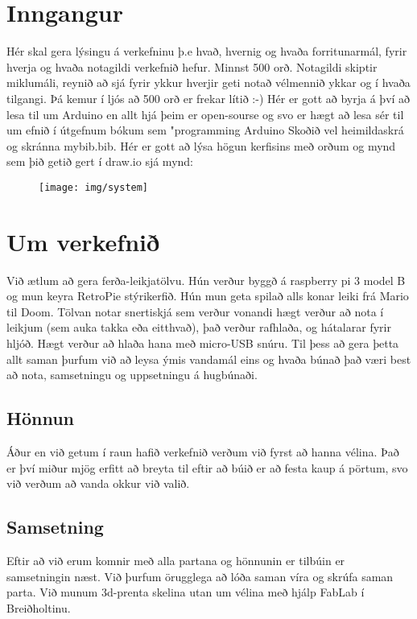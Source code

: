 \section{Inngangur}
Hér skal gera lýsingu á verkefninu þ.e hvað,  hvernig og  hvaða forritunarmál, fyrir hverja og hvaða notagildi verkefnið hefur. Minnst 500 orð. Notagildi skiptir miklumáli, reynið að sjá fyrir ykkur hverjir geti notað vélmennið ykkar og í hvaða tilgangi.  Þá kemur í ljós að 500 orð er frekar lítið :-) Hér er gott að byrja á því að lesa til um Arduino en allt hjá þeim er open-sourse og svo er hægt að lesa sér til um efnið í útgefnum bókum sem "programming Arduino \cite{monk} Skoðið vel heimildaskrá og skránna mybib.bib. Hér er gott að lýsa högun kerfisins með orðum og mynd sem þið getið gert í draw.io sjá mynd:

\begin{figure}[h]
\texttt{[image: img/system]}
\end{figure}
\section{Um verkefnið}
Við ætlum að gera ferða-leikjatölvu. Hún verður byggð á raspberry pi 3 model B og mun keyra RetroPie stýrikerfið. Hún mun geta spilað alls konar leiki frá Mario til Doom. Tölvan notar snertiskjá sem verður vonandi hægt verður að nota í leikjum (sem auka takka eða eitthvað), það verður rafhlaða, og hátalarar fyrir hljóð. Hægt verður að hlaða hana með micro-USB snúru. Til þess að gera þetta allt saman þurfum við að leysa ýmis vandamál eins og hvaða búnað það væri best að nota, samsetningu og uppsetningu á hugbúnaði.

\subsection{Hönnun}

Áður en við getum í raun hafið verkefnið verðum við fyrst að hanna vélina. Það er því miður mjög erfitt að breyta til eftir að búið er að festa kaup á pörtum, svo við verðum að vanda okkur við valið.

\subsection{Samsetning}

Eftir að við erum komnir með alla partana og hönnunin er tilbúin er samsetningin næst. Við þurfum örugglega að lóða saman víra og skrúfa saman parta. Við munum 3d-prenta skelina utan um vélina með hjálp FabLab í Breiðholtinu.


